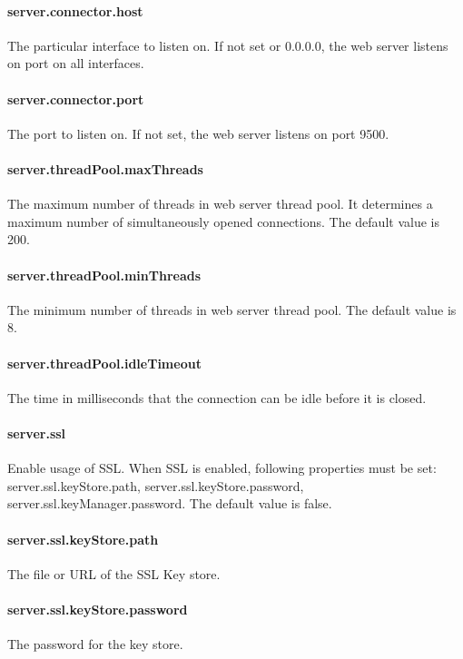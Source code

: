 \paragraph{server.connector.host}
The particular interface to listen on. If not set or 0.0.0.0, the web server
listens on port on all interfaces.

\paragraph{server.connector.port}
The port to listen on. If not set, the web server listens on port 9500.

\paragraph{server.threadPool.maxThreads}
The maximum number of threads in web server thread pool. It determines a maximum
number of simultaneously opened connections. The default value is 200.

\paragraph{server.threadPool.minThreads}
The minimum number of threads in web server thread pool. The default value is 8.

\paragraph{server.threadPool.idleTimeout}
The time in milliseconds that the connection can be idle before it is closed.

\paragraph{server.ssl}
Enable usage of SSL. When SSL is enabled, following properties must be set:
server.ssl.keyStore.path, server.ssl.keyStore.password, server.ssl.keyManager.password.
The default value is false.

\paragraph{server.ssl.keyStore.path}
The file or URL of the SSL Key store.

\paragraph{server.ssl.keyStore.password}
The password for the key store.


